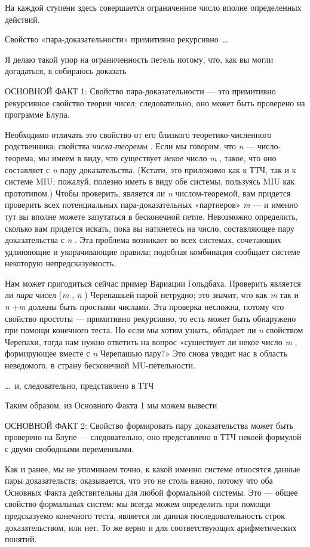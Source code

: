 \documentclass[../main.tex]{subfiles}
\begin{document}
На каждой ступени здесь совершается ограниченное число вполне определенных действий.

Свойство «пара-доказательности» примитивно рекурсивно~\ldots{}

Я делаю такой упор на ограниченность петель потому, что, как вы могли догадаться, я собираюсь доказать

ОСНОВНОЙ ФАКТ 1: Свойство пара-доказательности --- это примитивно рекурсивное свойство теории чисел; следовательно, оно может быть проверено на программе Блупа.

Необходимо отличать это свойство от его близкого теоретико-численного родственника: свойства \emph{числа-теоремы} . Если мы говорим, что \emph{n} --- число-теорема, мы имеем в виду, что существует \emph{некое} число \emph{m} , такое, что оно составляет с \emph{n} пару доказательства. (Кстати, это приложимо как к ТТЧ, так и к системе MIU; пожалуй, полезно иметь в виду обе системы, пользуясь MIU как прототипом.) Чтобы проверить, является ли \emph{n} числом-теоремой, вам придется проверить всех потенциальных пара-доказательных «партнеров» \emph{m} --- и именно тут вы вполне можете запутаться в бесконечной петле. Невозможно определить, сколько вам придется искать, пока вы наткнетесь на число, составляющее пару доказательства с \emph{n} . Эта проблема возникает во всех системах, сочетающих удлиняющие и укорачивающие правила; подобная комбинация сообщает системе некоторую непредсказуемость.

Нам может пригодиться сейчас пример Вариации Гольдбаха. Проверить является ли \emph{пара} чисел (\emph{m} , \emph{n} ) Черепашьей парой нетрудно; это значит, что как \emph{m} так и \emph{n} +\emph{m} должны быть простыми числами. Эта проверка несложна, потому что свойство простоты --- примитивно рекурсивно, то есть может быть обнаружено при помощи конечного теста. Но если мы хотим узнать, обладает ли \emph{n} свойством Черепахи, тогда нам нужно ответить на вопрос «существует ли некое число \emph{m} , формирующее вместе с \emph{n} Черепашью пару?» Это снова уводит нас в область неведомого, в страну бесконечной MU-петельности.

\ldots~и, следовательно, представлено в ТТЧ

Таким образом, из Основного Факта 1 мы можем вывести

ОСНОВНОЙ ФАКТ 2: Свойство формировать пару доказательства может быть проверено на Блупе --- следовательно, оно представлено в ТТЧ некоей формулой с двумя свободными переменными.

Как и ранее, мы не упоминаем точно, к какой именно системе относятся данные пары доказательств; оказывается, что это не столь важно, потому что оба Основных Факта действительны для любой формальной системы. Это --- общее свойство формальных систем: мы всегда можем определить при помощи предсказуемо конечного теста, является ли данная последовательность строк доказательством, или нет. То же верно и для соответствующих арифметических понятий.
\end{document}
